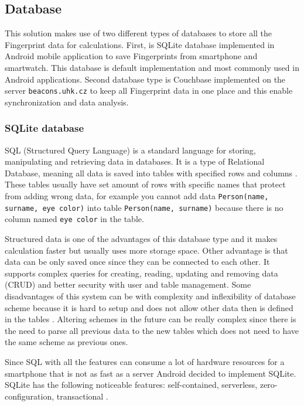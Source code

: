 \subsection{Database}\label{subsec:Database}
This solution makes use of two different types of databases to store all the Fingerprint data for calculations. First, is SQLite database implemented in Android mobile application to save Fingerprints from smartphone and smartwatch. This database is default implementation and most commonly used in Android applications. Second database type is Couchbase implemented on the server \verb|beacons.uhk.cz| to keep all Fingerprint data in one place and this enable synchronization and data analysis.

\subsubsection{SQLite database}\label{subsec:SQLiteDatabase}
SQL (Structured Query Language) is a standard language for storing, manipulating and retrieving data in databases. It is a type of Relational Database, meaning all data is saved into tables with specified rows and columns \cite{WISQLITE}. These tables usually have set amount of rows with specific names that protect from adding wrong data, for example you cannot add data \verb|Person(name, surname, eye color)| into table \verb|Person(name, surname)| because there is no column named \verb|eye color| in the table.

Structured data is one of the advantages of this database type and it makes calculation faster but usually uses more storage space. Other advantage is that data can be only saved once since they can be connected to each other. It supports complex queries for creating, reading, updating and removing data (CRUD) and better security with user and table management. Some disadvantages of this system can be with complexity and inflexibility of database scheme because it is hard to setup and does not allow other data then is defined in the tables \cite{ERDMS}. Altering schemes in the future can be really complex since there is the need to parse all previous data to the new tables which does not need to have the same scheme as previous ones.

Since SQL with all the features can consume a lot of hardware resources for a smartphone that is not as fast as a server Android decided to implement SQLite. SQLite has the following noticeable features: self-contained, serverless, zero-configuration, transactional \cite{WISQLITE}.

